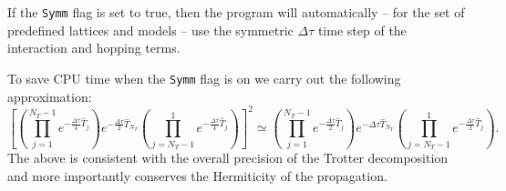 If the  \texttt{Symm}    flag is set to true,  then the program will automatically --  for the set of predefined lattices  and models -- use the symmetric   $\Delta \tau$ time step  of the interaction and 
hopping terms.

To save CPU time  when the \texttt{Symm}  flag is on  we  carry out the following   approximation:
\begin{equation}
	\left[  
	  \left(\prod_{j=1}^{N_T-1} e^{-\frac{\Delta \tau}{4} \hat{T}_j } \right)    e^{-\frac{\Delta \tau}{2} \hat{T}_{N_T} }    
   \left(  \prod_{j=N_T-1}^{1} e^{-\frac{\Delta \tau}{4} \hat{T}_j } \right)      \right]^2   \simeq
	  \left(\prod_{j=1}^{N_T-1} e^{-\frac{\Delta \tau}{2} \hat{T}_j } \right)    e^{-\Delta \tau\hat{T}_{N_T} }    
   \left(  \prod_{j=N_T-1}^{1} e^{-\frac{\Delta \tau}{2} \hat{T}_j } \right).   
\end{equation}
The above  is consistent with the overall precision of the Trotter decomposition and more importantly  conserves the Hermiticity of the propagation. 

